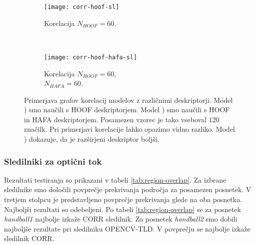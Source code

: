 \begin{figure}[!htbp]
	\centering
	\begin{subfigure}[t]{0.45\columnwidth}
		\texttt{[image: corr-hoof-sl]}
		\caption{Korelacija $N_{HOOF}=60$.}
		\label{fig:izbira-hoof}
	\end{subfigure}
	~
	\begin{subfigure}[t]{0.45\columnwidth}
		\texttt{[image: corr-hoof-hafa-sl]}
		\caption{Korelacija $N_{HOOF}=60$,\\$N_{HAFA}=60$.}
		\label{fig:izbira-hoofhafa}
	\end{subfigure}
	\caption[Primerjava modelov s HOOF in HOOF-HAFA deskriptorji]{Primerjava grafov korelacij modelov z različnimi deskriptorji. Model ) smo naučili s HOOF deskriptorjem. Model ) smo naučili s HOOF in HAFA deskriptorjem. Posamezen vzorec je tako vseboval $120$ značilk. Pri primerjavi korelacije lahko opazimo vidno razliko. Model ) dokazuje, da je razširjeni deskriptor boljši.}
	\label{fig:izbira}
\end{figure}




















\subsubsection{Sledilniki za optični tok} \label{sec:rezultati-sledilnikov-za-opticni-tok}


Rezultati testiranja so prikazani v tabeli \ref{tab:region-overlap}. Za izbrane sledilnike smo določili povprečje prekrivanja področja za posamezen posnetek. V tretjem stolpcu je predstavljeno povprečje prekrivanja glede na oba posnetka. Najboljši rezultati so odebeljeni. Po tabeli \ref{tab:region-overlap} se za posnetek \textit{handball1} najbolje izkaže CORR sledilnik. Za posnetek \textit{handball2} smo dobili najboljše rezultate pri sledilniku OPENCV-TLD. V povprečju se najbolje izkaže sledilnik CORR.




